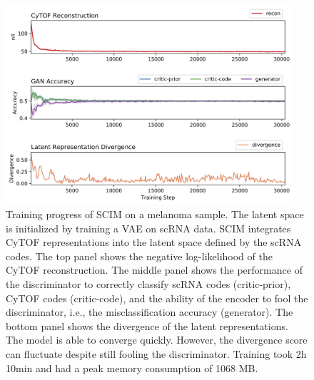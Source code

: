 \begin{figure}[htbp]
    \centering
    \includegraphics[width=0.95\textwidth]{figures/integration/menytek-train-scores.png}
    \caption{
        Training progress of SCIM on a melanoma sample.
        The latent space is initialized by training a VAE on scRNA data.
        SCIM integrates CyTOF representations into the latent space
        defined by the scRNA codes.
        The top panel shows the negative log-likelihood of the CyTOF reconstruction.
        The middle panel shows the performance of the discriminator to correctly classify scRNA codes (critic-prior), CyTOF codes (critic-code), and the ability of the encoder to fool the discriminator, i.e., the misclassification accuracy (generator).
        The bottom panel shows the divergence of the latent representations.
        The model is able to converge quickly.
However, the divergence score can fluctuate despite still fooling the discriminator.
        Training took 2h 10min and had a peak memory consumption of 1068 MB.
    }
    \label{fig:tupro-train}
\end{figure}


